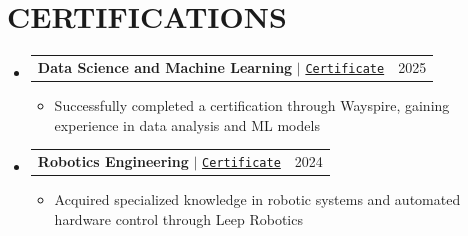 \documentclass[letterpaper,10pt]{article}
\makeatletter
\newcommand{\resumeItem}[1]{
  \item\small{
    {#1 \vspace{-1pt}}
  }
}
\newcommand{\resumeProjectHeading}[2]{
    \item
    \begin{tabular*}{\textwidth}{l@{\extracolsep{\fill}}r}
      #1 & {\color{dark-grey}\small #2} \\
    \end{tabular*}\vspace{-4pt}
}
\newcommand{\resumeSubHeadingListStart}{\begin{itemize}[leftmargin=0in, label={}]}
\newcommand{\resumeSubHeadingListEnd}{\end{itemize}}
\newcommand{\resumeItemListStart}{\begin{itemize}}
\newcommand{\resumeItemListEnd}{\end{itemize}\vspace{0pt}}
\makeatother
\begin{document}
\section{CERTIFICATIONS}
  \resumeSubHeadingListStart
    \resumeProjectHeading
      {\textbf{Data Science and Machine Learning} $|$ \href{https://drive.google.com/file/d/1ojNacJw_IAs-HOwOdBvabn_E_qpf9Ex-/view?usp=sharing}{\texttt{Certificate}}}{2025}
      \resumeItemListStart
        \resumeItem{Successfully completed a certification through Wayspire, gaining experience in data analysis and ML models}
      \resumeItemListEnd
    \resumeProjectHeading
      {\textbf{Robotics Engineering} $|$ \href{https://drive.google.com/file/d/1BP6JeRO4wB5FMddfOM6MgqnnZnxRmiKm/view?usp=sharing}{\texttt{Certificate}}}{2024}
      \resumeItemListStart
        \resumeItem{Acquired specialized knowledge in robotic systems and automated hardware control through Leep Robotics}
      \resumeItemListEnd
  \resumeSubHeadingListEnd


\end{document}
